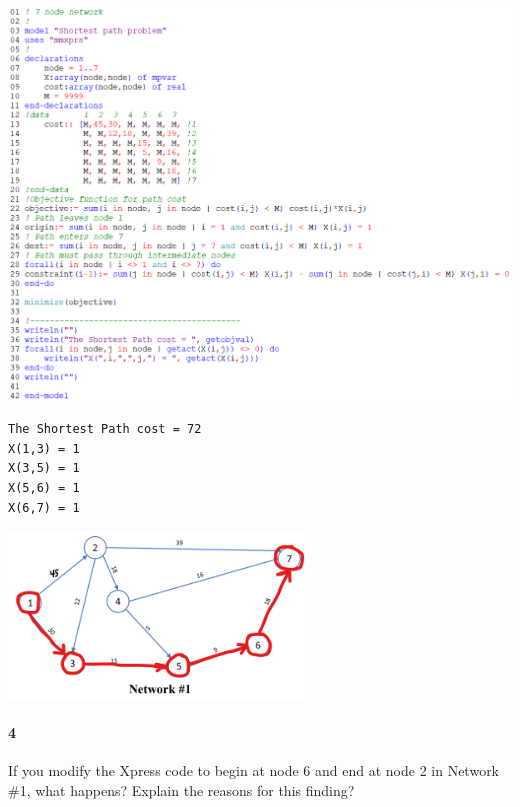 \documentclass[12pt]{article}
\newenvironment{fullbox}{\begin{lrbox}{\savefullbox}\begin{minipage}{\dimexpr\textwidth-2\fboxsep\relax}}{\end{minipage}\end{lrbox}\begin{center}\framebox[\textwidth]{\usebox{\savefullbox}}\end{center}}
\newenvironment{pbox}[1][]{\begin{fullbox}\ifx#1\empty\else\paragraph{#1}\fi}{\end{fullbox}}
\theoremstyle{definition}
\begin{document}
\begin{center}
    \includegraphics[width=\textwidth]{code2.png}
\end{center}
\begin{verbatim}
The Shortest Path cost = 72
X(1,3) = 1
X(3,5) = 1
X(5,6) = 1
X(6,7) = 1
\end{verbatim}
\begin{center}
    \includegraphics[width=0.6\textwidth]{sol2.png}
\end{center}


\begin{pbox}[4]
    If you modify the Xpress code to begin at node 6 and end at node 2 in Network \#1, what happens? Explain the reasons for this finding?
\end{pbox}
\end{document}
